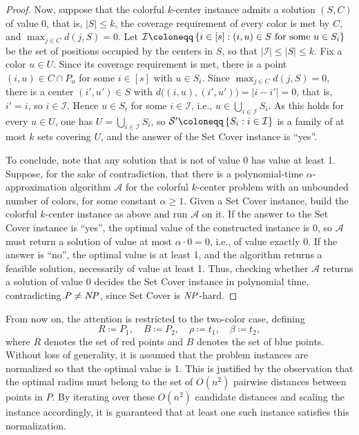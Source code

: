 \begin{proof}
    Now, suppose that the colorful $k$-center instance admits a solution $(S,C)$ of value 0, that is, $|S| \leq k$, the coverage requirement of every color is met by $C$, and $\max_{j \in C} d(j,S) = 0$. Let $\mathcal{I} \coloneqq \set{i \in [s] : (i,u) \in S \text{ for some } u \in S_i}$ be the set of positions occupied by the centers in $S$, so that $|\mathcal{I}| \leq |S| \leq k$. Fix a color $u \in U$. Since its coverage requirement is met, there is a point $(i,u) \in C \cap P_u$ for some $i \in [s]$ with $u \in S_i$. Since $\max_{j \in C} d(j,S) = 0$, there is a center $(i',u') \in S$ with $d\big((i,u),(i',u')\big) = |i - i'| = 0$, that is, $i' = i$, so $i \in \mathcal{I}$. Hence $u \in S_i$ for some $i \in \mathcal{I}$, i.e., $u \in \bigcup_{i \in \mathcal{I}} S_i$. As this holds for every $u \in U$, one has $U = \bigcup_{i \in \mathcal{I}} S_i$, so $\mathcal{S}' \coloneqq \set{S_i : i \in \mathcal{I}}$ is a family of at most $k$ sets covering $U$, and the answer of the Set Cover instance is ``yes''.

    To conclude, note that  any solution that is not of value 0 has value at least 1. Suppose, for the sake of contradiction, that there is a polynomial-time $\alpha$-approximation algorithm $\mathcal{A}$ for the colorful $k$-center problem with an unbounded number of colors, for some constant $\alpha \geq 1$. Given a Set Cover instance, build the colorful $k$-center instance as above and run $\mathcal{A}$ on it. If the answer to the Set Cover instance is ``yes'', the optimal value of the constructed instance is 0, so $\mathcal{A}$ must return a solution of value at most $\alpha \cdot 0 = 0$, i.e., of value exactly 0. If the answer is ``no'', the optimal value is at least 1, and the algorithm returns a feasible solution, necessarily of value at least 1. Thus, checking whether $\mathcal{A}$ returns a solution of value 0 decides the Set Cover instance in polynomial time, contradicting $\mathit{P} \neq \mathit{NP}$, since Set Cover is $\mathit{NP}$-hard.
\end{proof}
From now on, the attention is restricted to the two-color case, defining
\[
  R\coloneqq P_1,\quad
  B \coloneqq P_2,\quad
  \rho \coloneqq t_1 ,\quad
  \beta \coloneqq t_2,
\]
where $R$ denotes the set of red points and $B$ denotes the set of blue points.
Without loss of generality, it is assumed that the problem instances are normalized so that the optimal value is 1. 
This is justified by the observation that the optimal radius must belong to the set of $O(n^2)$ pairwise distances between points in $P$. 
By iterating over these $O(n^2)$ candidate distances and scaling the instance accordingly, it is guaranteed that at least one such instance satisfies this normalization.

